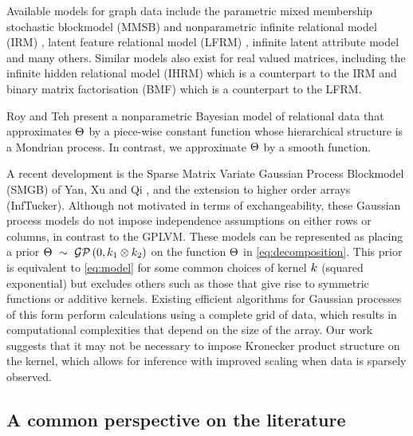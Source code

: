 Available models for graph data include the parametric mixed membership stochastic blockmodel (MMSB) \citep{Airoldi2008-fr} and nonparametric infinite relational model (IRM) \cite{Kemp2006-jt}, latent feature relational model (LFRM) \cite{Miller2009-wg}, infinite latent attribute model \cite{Palla2012-ch} and many others.
Similar models also exist for real valued matrices, including the infinite hidden relational model (IHRM) \citep{Xu2006-uy} which is a counterpart to the IRM and binary matrix factorisation (BMF) \citep{Meeds2007-gd} which is a counterpart to the LFRM.

Roy and Teh \citep{Roy2009-ge,} present a nonparametric Bayesian model of relational data that approximates $\Theta$ by a piece-wise constant function whose hierarchical structure is a Mondrian process. In contrast, we approximate $\Theta$ by a smooth function.

A recent development is the Sparse Matrix Variate Gaussian Process Blockmodel (SMGB) of Yan, Xu and Qi \cite{Yan2011-lc}, and the extension to higher order arrays \cite{Xu2012-ub} (InfTucker).
Although not motivated in terms of exchangeability, these Gaussian process models do not impose independence assumptions on either rows or columns, in contrast to the GPLVM.
These models can be represented as placing a prior ${\Theta \ \sim\  \mathcal{GP}\,(0, k_1 \otimes k_2)}$ on the function $\Theta$ in \eqref{eq:decomposition}.
This prior is equivalent to \eqref{eq:model} for some common choices of kernel $k$ (\eg squared exponential) but excludes others such as those that give rise to symmetric functions or additive kernels.
Existing efficient algorithms for Gaussian processes of this form \citep[e.g.][]{Saatci2011-yo} perform calculations using a complete grid of data, which results in computational complexities that depend on the size of the array.
Our work suggests that it may not be necessary to impose Kronecker product structure on the kernel, which allows for inference with improved scaling when data is sparsely observed.

\subsection{A common perspective on the literature}


